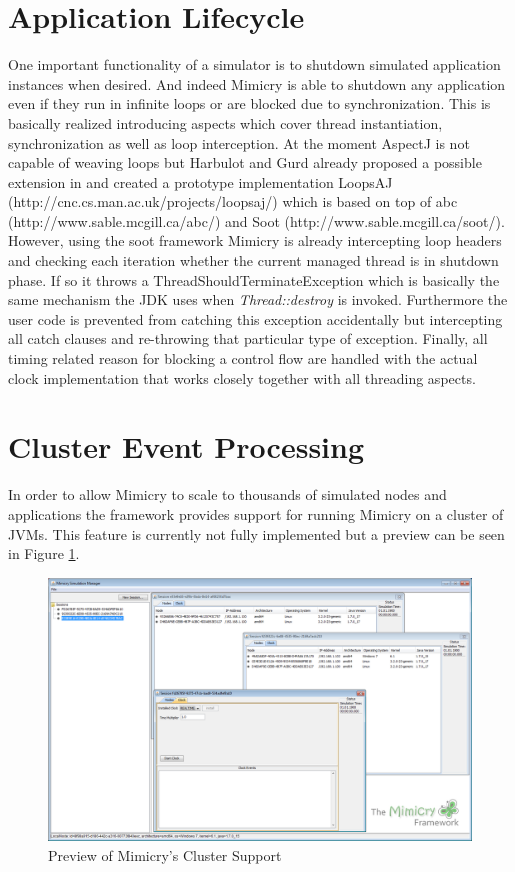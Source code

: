 \documentclass[a4paper,oneside]{book}
\begin{document}
\section{Application Lifecycle}
One important functionality of a simulator is to shutdown simulated application instances when desired. And indeed Mimicry is able to shutdown any application even if they run in infinite loops or are blocked due to synchronization. This is basically realized introducing aspects which cover thread instantiation, synchronization as well as loop interception. At the moment AspectJ is not capable of weaving loops but Harbulot and Gurd already proposed a possible extension in \cite{Harbulot:2006:JPL:1119655.1119666} and created a prototype implementation LoopsAJ (http://cnc.cs.man.ac.uk/projects/loopsaj/) which is based on top of abc (http://www.sable.mcgill.ca/abc/) and Soot (http://www.sable.mcgill.ca/soot/). 
However, using the soot framework Mimicry is already intercepting loop headers and checking each iteration whether the current managed thread is in shutdown phase. If so it throws a ThreadShouldTerminateException which is basically the same mechanism the JDK uses when \textit{Thread::destroy} is invoked. Furthermore the user code is prevented from catching this exception accidentally but intercepting all catch clauses and re-throwing that particular type of exception.
Finally, all timing related reason for blocking a control flow are handled with the actual clock implementation that works closely together with all threading aspects.


\section{Cluster Event Processing}
In order to allow Mimicry to scale to thousands of simulated nodes and applications the framework provides support for running Mimicry on a cluster of JVMs. This feature is currently not fully implemented but a preview can be seen in Figure \ref{clusterShowcase}.
\begin{figure}
\begin{center}
\includegraphics[width=\textwidth]{mimicry_showcase_03.png}
\caption{Preview of Mimicry's Cluster Support}
\label{clusterShowcase}
\end{center}
\end{figure}
\end{document}
